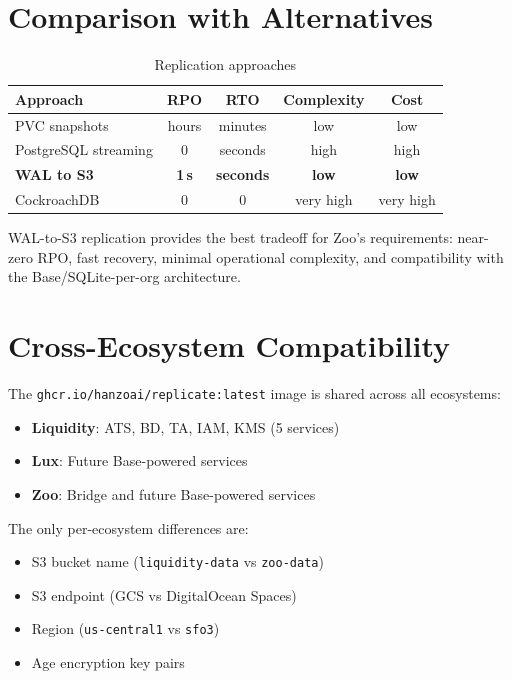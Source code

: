 \documentclass[twocolumn,11pt]{article}
\begin{document}
\section{Comparison with Alternatives}

\begin{table}[h]
\centering
\caption{Replication approaches}
\begin{tabular}{@{}lcccc@{}}
\toprule
Approach & RPO & RTO & Complexity & Cost \\
\midrule
PVC snapshots & hours & minutes & low & low \\
PostgreSQL streaming & 0 & seconds & high & high \\
\textbf{WAL to S3} & \textbf{1\,s} & \textbf{seconds} & \textbf{low} & \textbf{low} \\
CockroachDB & 0 & 0 & very high & very high \\
\bottomrule
\end{tabular}
\end{table}

WAL-to-S3 replication provides the best tradeoff for Zoo's
requirements: near-zero RPO, fast recovery, minimal operational
complexity, and compatibility with the Base/SQLite-per-org
architecture.

\section{Cross-Ecosystem Compatibility}

The \texttt{ghcr.io/hanzoai/replicate:latest} image is shared
across all ecosystems:

\begin{itemize}
\item \textbf{Liquidity}: ATS, BD, TA, IAM, KMS (5 services)
\item \textbf{Lux}: Future Base-powered services
\item \textbf{Zoo}: Bridge and future Base-powered services
\end{itemize}

The only per-ecosystem differences are:
\begin{itemize}
\item S3 bucket name (\texttt{liquidity-data} vs \texttt{zoo-data})
\item S3 endpoint (GCS vs DigitalOcean Spaces)
\item Region (\texttt{us-central1} vs \texttt{sfo3})
\item Age encryption key pairs
\end{itemize}
\end{document}
